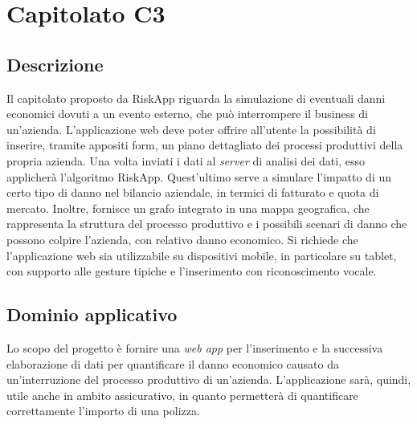 \newpage
\section{Capitolato C3}

\subsection{Descrizione}

Il capitolato proposto da RiskApp riguarda la simulazione di eventuali danni economici dovuti a un evento esterno, che può interrompere il business di un'azienda. L’applicazione web deve poter offrire all’utente la possibilità di inserire, tramite appositi form, un piano dettagliato dei processi produttivi della propria azienda. Una volta inviati i dati al \textit{server} di analisi dei dati, esso applicherà l'algoritmo RiskApp. Quest'ultimo serve a simulare l'impatto di un certo tipo di danno nel bilancio aziendale, in termici di fatturato e quota di mercato. Inoltre, fornisce un grafo integrato in una mappa geografica, che rappresenta la struttura del processo produttivo e i possibili scenari di danno che possono colpire l’azienda, con relativo danno economico. Si richiede che l'applicazione web sia utilizzabile su dispositivi mobile, in particolare su tablet, con supporto alle gesture tipiche e l'inserimento con riconoscimento vocale.

\subsection{Dominio applicativo}

Lo scopo del progetto è fornire una \textit{web app} per l'inserimento e la successiva elaborazione di dati per quantificare il danno economico causato da un'interruzione del processo produttivo di un'azienda. L'applicazione sarà, quindi, utile anche in ambito assicurativo, in quanto permetterà di quantificare correttamente l'importo di una polizza.

